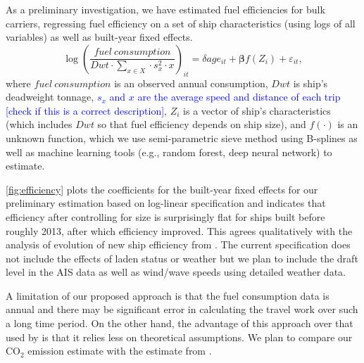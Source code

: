\documentclass[hidelinks, 12pt,letterpaper]{article}
\begin{document}
As a preliminary investigation, we have estimated fuel efficiencies for bulk carriers, regressing fuel efficiency on a set of ship characteristics (using logs of all variables) as well as built-year fixed effects.
 \begin{equation}\label{eq1}
 \log\left(
     \frac{fuel~consumption}{Dwt \cdot \sum_{x \in X}  \cdot s_x^2 \cdot x}
 \right)_{it}
         = \delta age_{it} + \boldsymbol{\beta}f(Z_i) + \varepsilon_{it},
 \end{equation}
 where $fuel~consumption$ is an observed annual consumption, $Dwt$ is ship's deadweight tonnage,  \textcolor{blue}{$s_x$ and $x$ are the average speed and distance of each trip [check if this is a correct description]},  $Z_i$ is a vector of ship's characteristics (which includes $Dwt$ so that fuel efficiency depends on ship size), and $f(\cdot)$ is an unknown function, which we use semi-parametric sieve method using B-splines as well as machine learning tools (e.g., random forest, deep neural network) to estimate.
 
\autoref{fig:efficiency} plots the coefficients for the built-year fixed effects for our preliminary estimation based on log-linear specification and indicates that efficiency after controlling for size is surprisingly flat for ships built before roughly 2013, after which efficiency improved. This agrees qualitatively with the analysis of evolution of new ship efficiency from \citet[][Figure 15]{faber2015historical}. The current specification does not include the effects of laden status or weather but we plan to include  the draft level in the AIS data as well as wind/wave speeds using detailed weather data. %

A limitation of our proposed approach is that the fuel consumption data is annual and there may be significant error in calculating the travel work over such a long time period. On the other hand, the advantage of this approach over that used by \citet{faber2020fourth} is that it relies less on theoretical assumptions. We plan to compare our CO$_2$ emission estimate with the estimate from \citet{faber2020fourth}. %
\end{document}
